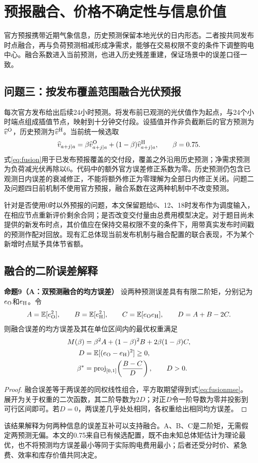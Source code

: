 \documentclass[UTF8,a4paper,zihao=-4,fontset=mac]{ctexart}
\newcommand{\E}{\mathbb E}
\begin{document}
\section{预报融合、价格不确定性与信息价值}
官方预报携带近期气象信息，历史预测保留本地光伏的日内形态。二者按共同发布时点融合，再与负荷预测相减形成净需求，能够在交易权限不变的条件下调整购电中心。融合系数进入当前预测，也进入历史残差重建，保证场景中的误差口径一致。

\subsection{问题三：按发布覆盖范围融合光伏预报}
每次官方发布给出后续24小时预测。将发布前已观测的光伏值作为起点，与24个小时端点组成插值节点，映射到十分钟交付段。设插值并作非负截断后的官方预测为$\widehat v^{\rm O}$，历史预测为$\widehat v^{\rm H}$。当前统一候选取
\begin{equation}\label{eq:fusion}
 \widehat v_{a+j\mid a}=\beta\widehat v^{\rm O}_{a+j\mid a}
 +(1-\beta)\widehat v^{\rm H}_{a+j\mid a},\qquad \beta=0.75.
\end{equation}
式\eqref{eq:fusion}用于已发布预报覆盖的交付段，覆盖之外沿用历史预测；净需求预测为负荷减光伏再除以6。代码中的额外官方误差修正系数为零。历史预测仍包含已观测日内误差的衰减修正，不能将额外修正为零理解为全部日内修正关闭。问题二及问题四日前机制不使用官方预报，融合系数在这两种机制中不改变预测。

针对是否使用0时以外预报的问题，本文保留题给6、12、18时发布作为调度输入，在相应节点重新评价剩余合同；是否改变交付量由总费用模型决定。对于题目尚未提供的新发布时点，其价值应在保持交易权限不变的条件下，用带真实发布时间戳的预测作配对回放。现有汇总体现当前发布机制与融合配置的联合表现，不为某个新增时点赋予具体节省额。

\subsection{融合的二阶误差解释}
\noindent\textbf{命题9（A：双预测融合的均方误差）}\quad
设两种预测误差具有有限二阶矩，分别记为$e_{\rm O}$和$e_{\rm H}$。令
\begin{equation}
 A=\E[e_{\rm O}^2],\qquad B=\E[e_{\rm H}^2],\qquad C=\E[e_{\rm O}e_{\rm H}],
 \qquad D=A+B-2C.
\end{equation}
则融合误差的均方误差及其在单位区间内的最优权重满足
\begin{align}
 M(\beta)&=\beta^2A+(1-\beta)^2B+2\beta(1-\beta)C,\label{eq:fusionmse}\\
 D&=\E[(e_{\rm O}-e_{\rm H})^2]\ge0,\notag\\
 \beta^*&=\operatorname{proj}_{[0,1]}\!\left(\frac{B-C}{D}\right),\qquad D>0.
\end{align}
\begin{proof}
融合误差等于两误差的同权线性组合，平方取期望得到式\eqref{eq:fusionmse}。展开为关于权重的二次函数，其二阶导数为$2D$；对正$D$令一阶导数为零并投影到可行区间即可。若$D=0$，两误差几乎处处相同，各权重给出相同均方误差。
\end{proof}
该结果解释为何两种信息的误差互补可以支持融合。A、B、C是二阶矩，无需假定两预测无偏。本文的0.75来自已有候选配置，既不由未知总体矩估计为理论最优，也不将预测均方误差最小等同于实际购电费用最小；后者还受分时价、紧急费、效率和库存价值共同决定。
\end{document}

